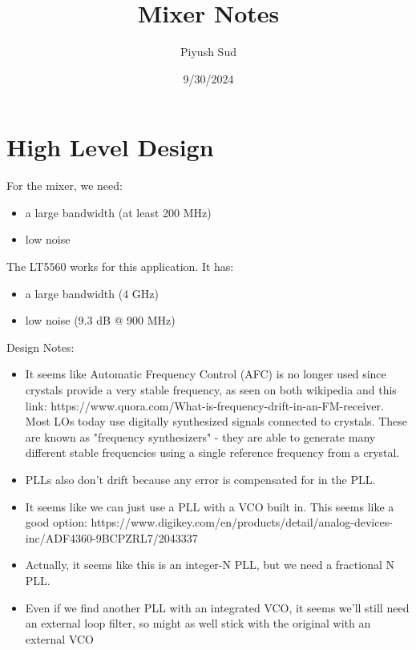 \documentclass[12pt, letterpaper]{article}
\title{Mixer Notes}
\author{Piyush Sud}
\date{9/30/2024}
\begin{document}
\maketitle

\pagebreak

\section{High Level Design}

For the mixer, we need:

\begin{itemize}
    \item a large bandwidth (at least 200 MHz)
    \item low noise
\end{itemize}

\noindent The LT5560 works for this application. It has:

\begin{itemize}
    \item a large bandwidth (4 GHz)
    \item low noise (9.3 dB @ 900 MHz)
\end{itemize}


\noindent Design Notes:

\begin{itemize}
    \item It seems like Automatic Frequency Control (AFC) is no longer used since crystals provide a very stable frequency, as seen on both wikipedia and this link: https://www.quora.com/What-is-frequency-drift-in-an-FM-receiver. Most LOs today use digitally synthesized signals connected to crystals. These are known as "frequency synthesizers" - they are able to generate many different stable frequencies using a single reference frequency from a crystal.
    \item PLLs also don't drift because any error is compensated for in the PLL.
    \item It seems like we can just use a PLL with a VCO built in. This seems like a good option: https://www.digikey.com/en/products/detail/analog-devices-inc/ADF4360-9BCPZRL7/2043337
    \item Actually, it seems like this is an integer-N PLL, but we need a fractional N PLL.
    \item Even if we find another PLL with an integrated VCO, it seems we'll still need an external loop filter, so might as well stick with the original with an external VCO
\end{itemize}
\end{document}
